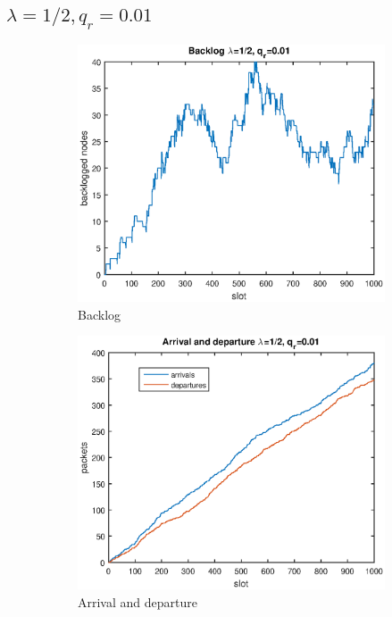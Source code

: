 \documentclass{article}
\begin{document}
\subsection{$\lambda = 1/2, q_r = 0.01$}
\begin{figure}[h]
  \begin{subfigure}{.5\textwidth}
    \includegraphics[width=\textwidth]{figures/backlog2.eps}
    \caption{Backlog}
    \label{fig:backlog2}
  \end{subfigure}%
  \begin{subfigure}{.5\textwidth}
    \includegraphics[width=\textwidth]{figures/arrival-departure-2.eps}
    \caption{Arrival and departure}
    \label{fig:arrival-departure-2}
  \end{subfigure}
  \caption{}
\end{figure}
\end{document}
